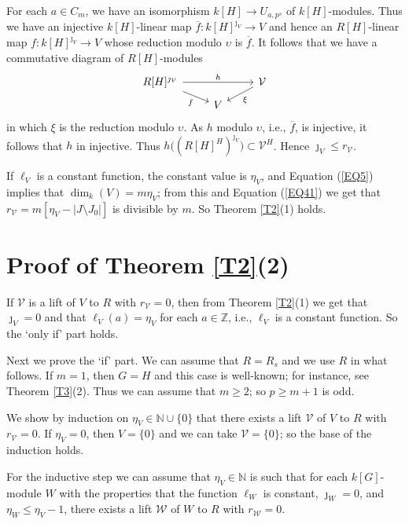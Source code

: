 \documentclass[11pt]{amsart}
\begin{document}
For each $a\in C_m$, we have an isomorphism $k[H]\rightarrow U_{a,p^s}$ of $k[H]$-modules. Thus we have an injective $k[H]$-linear map $\overline{f}:k[H]^{\jmath_V}\rightarrow V$ and hence an $R[H]$-linear map $f:k[H]^{\jmath_V}\rightarrow V$ whose reduction modulo $\upsilon$ is $\overline{f}$. It follows that we have a commutative diagram of $R[H]$-modules
$$\begin{tikzcd}[row sep=tiny]
R[H]^{\jmath_V} \arrow[rd, "f"'] \arrow[rr, "h"] & & \mathcal V \arrow[ld, "\xi"] \\
& V
\end{tikzcd}$$
in which $\xi$ is the reduction modulo $\upsilon$. As $h$ modulo $\upsilon$, i.e., $\overline{f}$, is injective, it follows that $h$ in injective. Thus $h\bigl((R[H]^H)^{\jmath_V}\bigr)\subset \mathcal V^H$. Hence $\jmath_V\le r_{\mathcal V}$.

If $\ell_V$ is a constant function, the constant value is $\eta_V$, and Equation (\ref{EQ5}) implies that $\dim_k(V)=m\eta_V$; from this and Equation (\ref{EQ41}) we get that $r_{\mathcal V}=m[\eta_V-|J\setminus J_0|]$ is divisible by $m$. So Theorem \ref{T2}(1) holds.

\section{Proof of Theorem \ref{T2}(2)}\label{S7}

If $\mathcal V$ is a lift of $V$ to $R$ with $r_{\mathcal V}=0$, then from Theorem \ref{T2}(1) we get that $\jmath_V=0$ and that $\ell_V(a)=\eta_V$ for each $a\in\mathbb Z$, i.e., $\ell_V$ is a constant function. So the `only if' part holds.

Next we prove the `if' part. We can assume that $R=R_s$ and we use $R$ in what follows. If $m=1$, then $G=H$ and this case is well-known; for instance, see Theorem \ref{T3}(2). Thus we can assume that $m\ge 2$; so $p\ge m+1$ is odd.

We show by induction on $\eta_V\in\mathbb N\cup\{0\}$ that there exists a lift $\mathcal V$ of $V$ to $R$ with $r_{\mathcal V}=0$. If $\eta_V=0$, then $V=\{0\}$ and we can take $\mathcal V=\{0\}$; so the base of the induction holds. 

For the inductive step we can assume that $\eta_V\in\mathbb N$ is such that for each $k[G]$-module $W$ with the properties that the function $\ell_W$ is constant, $\jmath_W=0$, and $\eta_W\le\eta_V-1$, there exists a lift $\mathcal W$ of $W$ to $R$ with $r_{\mathcal W}=0$. 
\end{document}
